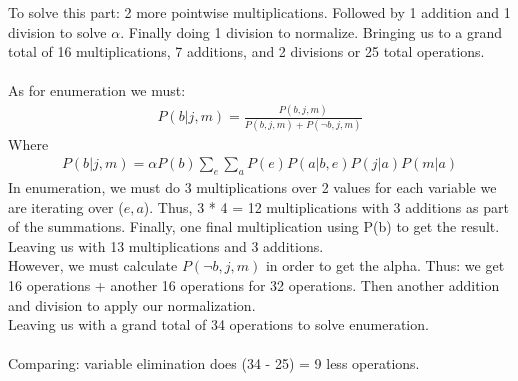 \documentclass{article}
\begin{document}
\begin{enumerate}[a)]
    To solve this part: 2 more pointwise multiplications. Followed by 1 addition and 1 division 
    to solve $\alpha$. Finally doing 1 division to normalize. Bringing us to a grand total 
    of 16 multiplications, 7 additions, and 2 divisions or 25 total operations.\\
    \\
    As for enumeration we must:
    \begin{gather*}
        P(b | j, m) = \frac{P(b, j, m)}{P(b, j, m) + P(\neg b, j, m)}
    \end{gather*}
    Where
    \begin{gather*}
        P(b|j,m) = \alpha P(b)\sum_{e}\sum_{a}P(e)P(a|b,e)P(j|a)P(m|a)
    \end{gather*}
    In enumeration, we must do 3 multiplications over 2 values for each variable we are
    iterating over ($e, a$). Thus, 3 * 4 = 12 multiplications with 3 additions as part of
    the summations. Finally, one final multiplication using P(b) to get the result. Leaving
    us with 13 multiplications and 3 additions.\\
    However, we must calculate $P(\neg b, j, m)$ in order to get the alpha. Thus: we get
    16 operations + another 16 operations for 32 operations. Then another addition and division
    to apply our normalization.\\
    Leaving us with a grand total of 34 operations to solve enumeration.\\
    \\
    Comparing: variable elimination does (34 - 25) = 9 less operations.
    

\end{enumerate}
\end{document}
